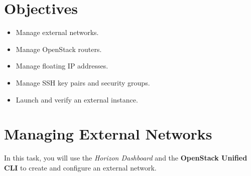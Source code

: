 \documentclass[letterpaper, 12pt]{article}
\begin{document}
\section*{Objectives}
\label{sec:objectives}
\begin{itemize}[itemsep=0pt]
    \item Manage external networks.
    \item Manage OpenStack routers.
    \item Manage floating IP addresses.
    \item Manage SSH key pairs and security groups.
    \item Launch and verify an external instance.
\end{itemize}
\clearpage

\section{Managing External Networks}
\label{sec:managing_external_networks}
In this task, you will use the \textit{Horizon Dashboard} and the \textbf{OpenStack Unified CLI} to create and configure
an external network.
\end{document}
